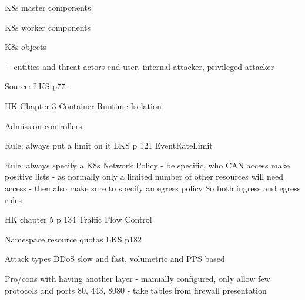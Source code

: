 \documentclass[Screen16to9,17pt]{foils}
\begin{document}

\begin{list2}
\item K8s master components
\item K8s worker components
\item K8s objects
\end{list2}

+ entities and threat actors end user, internal attacker, privileged attacker

Source: LKS p77-


\begin{list2}
\item HK Chapter 3 Container Runtime Isolation
\end{list2}



\begin{list2}
\item Admission controllers
\end{list2}

Rule: always put a limit on it
LKS p 121 EventRateLimit


Rule: always specify a K8s Network Policy - be specific, who CAN access
make positive lists - as normally only a limited number of other resources will need access
- then also make sure to specify an egress policy
So both ingress and egress rules

HK chapter 5 p 134 Traffic Flow Control


Namespace resource quotas LKS p182


\begin{list2}
\item Attack types DDoS slow and fast, volumetric and PPS based
\item Pro/cons with having another layer - manually configured, only allow few protocols and ports 80, 443, 8080
- take tables from firewall presentation
\end{list2}




\begin{list2}
\item
\end{list2}

\end{document}
